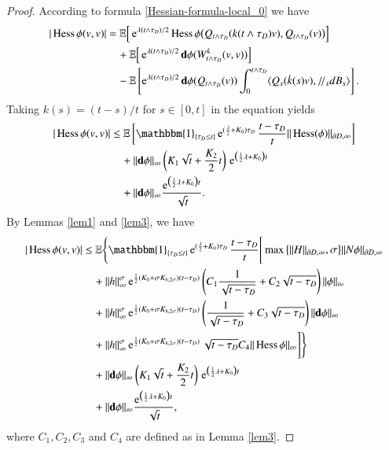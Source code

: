 \documentclass[11pt,reqno]{amsart}
\theoremstyle{definition} \newtheorem{remark}[theorem]{Remark}
\numberwithin{equation}{section}
\newcommand\1{\mathbbm{1}}
\def\bd{{\bf d}}
\def\r{\right}
\def\l{\left} \def\e{\operatorname{e}} \def\dsum{\displaystyle\sum}
\newcommand{\ptr}{/\!/}
\begin{document}
\begin{proof}
According to formula \eqref{Hessian-formula-local_0} we have
\begin{align*}
|\Hess\phi (v,v)|&= \E\Big[\e^{\lambda (t\wedge \tau_D)/2} \Hess \phi \big(Q_{t\wedge \tau_D}(k(t\wedge \tau_D)v), Q_{t\wedge \tau_D}(v)\big)\Big]\\
&\quad +\E\Big[\e^{\lambda (t\wedge \tau_D)/2} \bd \phi
      (W_{t\wedge \tau_D}^k(v, v))\Big]\\
  &\quad     -\E\l[\e^{\lambda (t\wedge \tau_D)/2} \bd \phi(Q_{t\wedge \tau_D}( v))\int_0^{t\wedge \tau_D}\langle Q_s(\dot{k}(s)v),
     \ptr_s d  B_s \rangle\r].
\end{align*}
Taking $k(s)=(t-s)/{t}$ for $s\in [0,t]$ in the equation yields
\begin{align*}
|\Hess \phi (v,v)| 
&\leq  \E\l[\1_{\{\tau_D\leq t\}}\e^{(\frac{\lambda}{2}+K_0)\tau_D}\frac{t-\tau_D}{t}\|\Hess (\phi)\|_{\partial D,\infty}\r]  \\
  &\quad + \|\bd \phi\|_{\infty} \l(K_1\sqrt{t}+\frac{K_2}{2}t\r)
    \,\e^{\big(\frac12\lambda+K_0\big)t}\\
&\quad + \|\bd \phi\|_{\infty}\frac{\e^{\big(\frac12\lambda+K_0\big) t}}{\sqrt{t}}.
\end{align*}
By Lemmas \ref{lem1} and \ref{lem3}, we have
\begin{align}\label{eq-Hess1}
|\Hess \phi (v,v)|
&\leq \E\Bigg\{\1_{\{\tau_D\leq t\}}\e^{(\frac{\lambda}{2}+K_0)\tau_D}\frac{t-\tau_D}{t}\Bigg[\max\big\{ \|H\|_{\partial D, \infty},\sigma\big\}\|N\phi\|_{\partial D, \infty}\notag\\
  &\quad +\|h\|_{\infty}^{\sigma}\e^{\frac{1}{2}(K_0+\sigma K_{h,2\sigma})(t-\tau_D)}\l(C_1\frac{1}{\sqrt{t-\tau_D}}+C_2\sqrt{t-\tau_D}\r)\|\phi\|_{\infty}\notag\\
  &\quad  +  \|h\|_{\infty}^{\sigma}\e^{\frac{1}{2}(K_0+\sigma K_{h,2\sigma})(t-\tau_D)}\l(\frac{1}{\sqrt{t-\tau_D}}+C_3\sqrt{t-\tau_D}\r)\|\bd \phi\|_{\infty}\notag\\
 &\quad   +\|h\|_{\infty}^{\sigma}\e^{\frac{1}{2}(K_0+\sigma K_{h,2\sigma})(t-\tau_D)}\sqrt{t-\tau_D}C_4\|\Hess \phi\|_{\infty}\Bigg]\Bigg\}  \notag \\
  &\quad + \|\bd \phi\|_{\infty} \l(K_1\sqrt{t}+\frac{K_2}{2}t\r)
    \,\e^{\big(\frac12\lambda+K_0\big)t}\notag\\
&\quad + \|\bd \phi\|_{\infty}\frac{\e^{\big(\frac12\lambda+K_0\big) t}}{\sqrt{t}},
\end{align}
where $C_1, C_2, C_3$ and $C_4$ are defined as in Lemma \ref{lem3}.

\end{proof}
\end{document}
